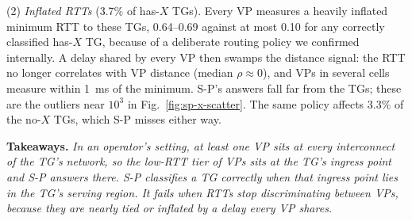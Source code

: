(2) \emph{Inflated RTTs} (3.7\% of has-$X$ TGs). Every VP measures a heavily inflated minimum RTT to these TGs, 0.64--0.69 against at most 0.10 for any correctly classified has-$X$ TG, because of a deliberate routing policy we confirmed internally. A delay shared by every VP then swamps the distance signal: the RTT no longer correlates with VP distance (median $\rho \approx 0$), and VPs in several cells measure within 1~ms of the minimum. S-P's answers fall far from the TGs; these are the outliers near $10^3$ in Fig.~\ref{fig:sp-x-scatter}. The same policy affects 3.3\% of the no-$X$ TGs, which S-P misses either way. 


\noindent \textbf{Takeaways.} \textit{In an operator's setting, at least one VP sits at every interconnect of the TG's network, so the low-RTT tier of VPs sits at the TG's ingress point and S-P answers there. S-P classifies a TG correctly when that ingress point lies in the TG's serving region. It fails when RTTs stop discriminating between VPs, because they are nearly tied or inflated by a delay every VP shares.}
